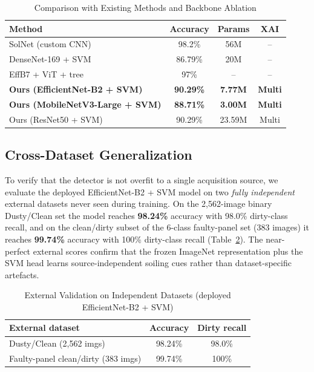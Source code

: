 \documentclass{IEEEtran}
\begin{document}
\begin{table}[t]
  \centering
  \caption{Comparison with Existing Methods and Backbone Ablation}
  \label{tab:comparison}
  \begin{tabular}{lccc}
    \toprule
    \textbf{Method} & \textbf{Accuracy} & \textbf{Params} & \textbf{XAI} \\
    \midrule
    SolNet (custom CNN)~\cite{onim2023solnet} & 98.2\% & 56M & -- \\
    DenseNet-169 + SVM~\cite{alatwi2024deep} & 86.79\% & 20M & -- \\
    EffB7 + ViT + tree~\cite{bassil2025efficient} & 97\% & -- & -- \\
    \midrule
    \textbf{Ours (EfficientNet-B2 + SVM)} & \textbf{90.29\%} & \textbf{7.77M} & \textbf{Multi} \\
    \textbf{Ours (MobileNetV3-Large + SVM)} & \textbf{88.71\%} & \textbf{3.00M} & \textbf{Multi} \\
    Ours (ResNet50 + SVM) & 90.29\% & 23.59M & Multi \\
    \bottomrule
  \end{tabular}
\end{table}

\subsection{Cross-Dataset Generalization}
To verify that the detector is not overfit to a single acquisition source, we evaluate the deployed EfficientNet-B2 + SVM model on two \emph{fully independent} external datasets never seen during training. On the 2,562-image binary Dusty/Clean set the model reaches \textbf{98.24\%} accuracy with 98.0\% dirty-class recall, and on the clean/dirty subset of the 6-class faulty-panel set (383 images) it reaches \textbf{99.74\%} accuracy with 100\% dirty-class recall (Table~\ref{tab:external}). The near-perfect external scores confirm that the frozen ImageNet representation plus the SVM head learns source-independent soiling cues rather than dataset-specific artefacts.

\begin{table}[t]
  \centering
  \caption{External Validation on Independent Datasets (deployed EfficientNet-B2 + SVM)}
  \label{tab:external}
  \begin{tabular}{lcc}
    \toprule
    \textbf{External dataset} & \textbf{Accuracy} & \textbf{Dirty recall} \\
    \midrule
    Dusty/Clean (2,562 imgs) & 98.24\% & 98.0\% \\
    Faulty-panel clean/dirty (383 imgs) & 99.74\% & 100\% \\
    \bottomrule
  \end{tabular}
\end{table}
\end{document}
